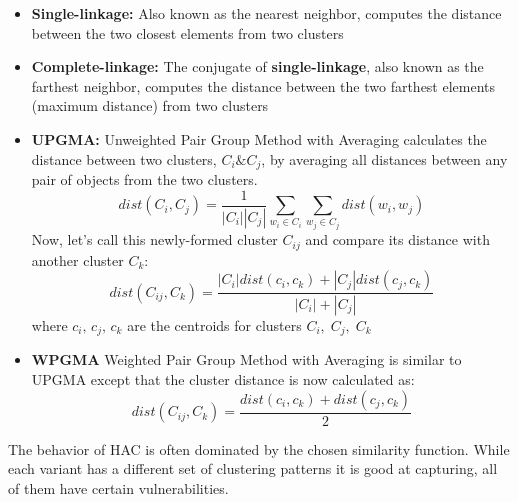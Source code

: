 \documentclass[conference]{IEEEtran}
\begin{document}
\begin{itemize}
	\item \textbf{Single-linkage:} Also known as the nearest neighbor, computes the distance between the two closest elements from two clusters
	\item \textbf{Complete-linkage:} The conjugate of \textbf{single-linkage}, also known as the farthest neighbor, computes the distance between the two farthest elements (maximum distance) from two clusters
	\item \textbf{UPGMA: } Unweighted Pair Group Method with Averaging calculates the distance between two clusters, $C_i \& C_j$, by averaging all distances between any pair of objects from the two clusters.
	\begin{equation*}
		dist(C_i, C_j) = \frac{1}{|C_i||C_j|}\sum_{w_i \in C_i}\sum_{w_j \in C_j}dist(w_i, w_j)
	\end{equation*}
	Now, let's call this newly-formed cluster $C_{ij}$ and compare its distance with another cluster $C_k$:
	\begin{equation*}
		dist(C_{ij}, C_k) =  \frac{|C_i|dist(c_i,c_k) + |C_j|dist(c_j,c_k)}{|C_i|+|C_j|}
	\end{equation*}
	where $c_i,\,c_j,\,c_k$ are the centroids for clusters $C_i,\;C_j,\;C_k$
	\item \textbf{WPGMA} Weighted Pair Group Method with Averaging is similar to UPGMA except that the cluster distance is now calculated as:
	\begin{equation*}
		dist(C_{ij}, C_k) =  \frac{dist(c_i,c_k) + dist(c_j,c_k)}{2}
	\end{equation*}
\end{itemize}

 The behavior of HAC is often dominated by the chosen similarity function. While each variant has a different set of clustering patterns it is good at capturing, all of them have certain vulnerabilities. 

%
%
%
%
%
\end{document}
